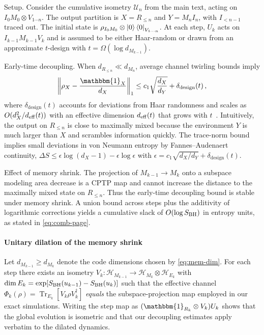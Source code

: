 \documentclass[a4paper,11pt]{article}
\newcommand{\Tr}{\operatorname{Tr}}
\theoremstyle{plain}
\theoremstyle{definition}
\theoremstyle{remark}
\begin{document}
Setup. Consider the cumulative isometry $\mathcal{U}_n$ from the main text, acting on $I_0 M_0 \otimes V_{1\cdots n}$. The output partition is $X=R_{\le n}$ and $Y=M_n I_n$, with $I_{<n-1}$ traced out. The initial state is $\rho_{I_0M_0}\otimes \left|0\right\rangle\left\langle0\right|_{V_{1\cdots n}}$. At each step, $U_k$ acts on $I_{k-1}M_{k-1}V_k$ and is assumed to be either Haar-random or drawn from an approximate $t$-design with $t=\Omega(\log d_{M_{k-1}})$.

Early-time decoupling. When $d_{R_{\le n}}\ll d_{M_n}$, average channel twirling bounds imply 
\begin{equation}
\left\|\rho_{X} - \frac{\mathbbm{1}_X}{d_X}\right\|_1 \le c_1 \sqrt{\frac{d_X}{d_Y}} + \delta_{\text{design}}(t)\,,
\end{equation}
where $\delta_{\text{design}}(t)$ accounts for deviations from Haar randomness and scales as $O(d_X^2/d_{\rm eff}(t))$ with an effective dimension $d_{\rm eff}(t)$ that grows with $t$~\cite{Brandao:2016}. Intuitively, the output on $R_{\le n}$ is close to maximally mixed because the environment $Y$ is much larger than $X$ and scrambles information quickly. The trace-norm bound implies small deviations in von Neumann entropy by Fannes--Audenaert continuity, $\Delta S \le \epsilon \log (d_X-1)-\epsilon \log \epsilon$ with $\epsilon=c_1\sqrt{d_X/d_Y}+\delta_{\text{design}}(t)$.

Effect of memory shrink. The projection of $M_{k-1}\to M_k$ onto a subspace modeling area decrease is a CPTP map and cannot increase the distance to the maximally mixed state on $R_{\le n}$. Thus the early-time decoupling bound is stable under memory shrink. A union bound across steps plus the additivity of logarithmic corrections yields a cumulative slack of $O(\log S_{\rm BH})$ in entropy units, as stated in \eqref{eq:comb-page}.

\paragraph{Unitary dilation of the memory shrink}
Let $d_{M_{k-1}}\ge d_{M_k}$ denote the code dimensions chosen by \eqref{eq:mem-dim}. For each step there exists an isometry $V_k:\mathcal{H}_{M_{k-1}}\to\mathcal{H}_{M_k}\otimes\mathcal{H}_{E_k}$ with $\dim E_k=\exp\!\left[S_{\rm BH}(u_{k-1})-S_{\rm BH}(u_k)\right]$ such that the effective channel $\Phi_k(\rho)=\Tr_{E_k}[V_k \rho V_k^\dagger]$ \emph{equals} the subspace-projection map employed in our exact simulations. Writing the step map as $(\mathbbm{1}_{R_k}\otimes V_k)U_k$ shows that the global evolution is isometric and that our decoupling estimates apply verbatim to the dilated dynamics.
\end{document}
